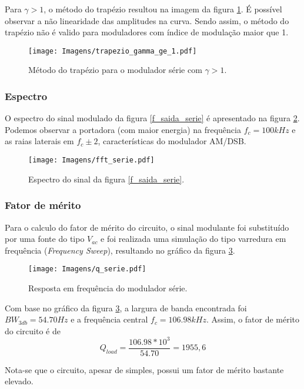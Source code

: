 Para $\gamma > 1$, o método do trapézio resultou na imagem da figura \ref{f_trapezio_gamma_ge_1}. É possível observar a não linearidade das amplitudes na curva. Sendo assim, o método do trapézio não é valido para moduladores com índice de modulação maior que 1.

\begin{figure}[H]
    \centering
    \caption{Método do trapézio para o modulador série com $\gamma > 1$.}
    \texttt{[image: Imagens/trapezio\_gamma\_ge\_1.pdf]}
    \label{f_trapezio_gamma_ge_1}
\end{figure}

\subsubsection{Espectro}

O espectro do sinal modulado da figura \ref{f_saida_serie} é apresentado na figura \ref{f_fft_serie}.
Podemos observar a portadora (com maior energia) na frequência $f_c = 100kHz$ e as raias laterais em $f_c \pm 2$, características do modulador AM/DSB.

\begin{figure}[H]
    \centering
    \caption{Espectro do sinal da figura \ref{f_saida_serie}.}
    \texttt{[image: Imagens/fft\_serie.pdf]}
    \label{f_fft_serie}
\end{figure}

\subsubsection{Fator de mérito}

Para o calculo do fator de mérito do circuito, o sinal modulante foi substituído por uma fonte do tipo $V_{ac}$ e foi realizada uma simulação do tipo varredura em frequência (\textit{Frequency Sweep}), resultando no gráfico da figura \ref{f_q_serie}.

\begin{figure}[H]
    \centering
    \caption{Resposta em frequência do modulador série.}
    \texttt{[image: Imagens/q\_serie.pdf]}
    \label{f_q_serie}
\end{figure}

Com base no gráfico da figura \ref{f_q_serie}, a largura de banda encontrada foi $BW_{3db} = 54.70 Hz$ e a frequência central $f_c = 106.98 kHz$. Assim, o fator de mérito do circuito é de
\[
Q_{load} = \frac{106.98*10^3}{54.70} = 1955,6
\]

Nota-se que o circuito, apesar de simples, possui um fator de mérito bastante elevado.\\

